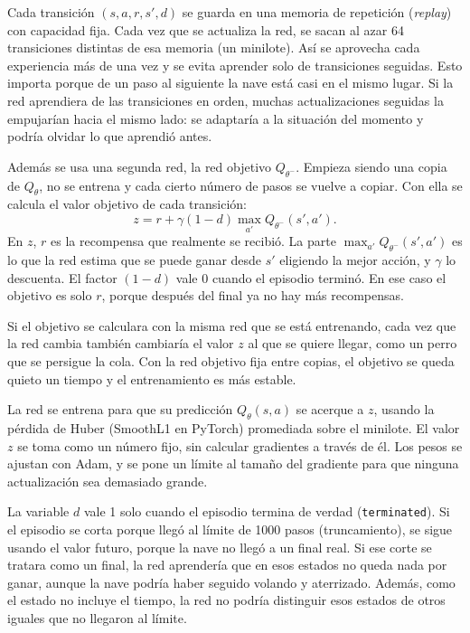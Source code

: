 \documentclass[conference]{IEEEtran}
\begin{document}
Cada transición $(s,a,r,s',d)$ se guarda en una memoria de repetición (\textit{replay}) con capacidad fija. Cada vez que se actualiza la red, se sacan al azar 64 transiciones distintas de esa memoria (un minilote). Así se aprovecha cada experiencia más de una vez y se evita aprender solo de transiciones seguidas. Esto importa porque de un paso al siguiente la nave está casi en el mismo lugar. Si la red aprendiera de las transiciones en orden, muchas actualizaciones seguidas la empujarían hacia el mismo lado: se adaptaría a la situación del momento y podría olvidar lo que aprendió antes.

Además se usa una segunda red, la red objetivo $Q_{\theta^-}$. Empieza siendo una copia de $Q_\theta$, no se entrena y cada cierto número de pasos se vuelve a copiar. Con ella se calcula el valor objetivo de cada transición:
\begin{equation}
 z=r+\gamma(1-d)\max_{a'}Q_{\theta^-}(s',a').
\end{equation}
En $z$, $r$ es la recompensa que realmente se recibió. La parte $\max_{a'}Q_{\theta^-}(s',a')$ es lo que la red estima que se puede ganar desde $s'$ eligiendo la mejor acción, y $\gamma$ lo descuenta. El factor $(1-d)$ vale 0 cuando el episodio terminó. En ese caso el objetivo es solo $r$, porque después del final ya no hay más recompensas.

Si el objetivo se calculara con la misma red que se está entrenando, cada vez que la red cambia también cambiaría el valor $z$ al que se quiere llegar, como un perro que se persigue la cola. Con la red objetivo fija entre copias, el objetivo se queda quieto un tiempo y el entrenamiento es más estable.

La red se entrena para que su predicción $Q_\theta(s,a)$ se acerque a $z$, usando la pérdida de Huber (SmoothL1 en PyTorch) promediada sobre el minilote. El valor $z$ se toma como un número fijo, sin calcular gradientes a través de él. Los pesos se ajustan con Adam, y se pone un límite al tamaño del gradiente para que ninguna actualización sea demasiado grande.

La variable $d$ vale 1 solo cuando el episodio termina de verdad (\texttt{terminated}). Si el episodio se corta porque llegó al límite de 1000 pasos (truncamiento), se sigue usando el valor futuro, porque la nave no llegó a un final real. Si ese corte se tratara como un final, la red aprendería que en esos estados no queda nada por ganar, aunque la nave podría haber seguido volando y aterrizado. Además, como el estado no incluye el tiempo, la red no podría distinguir esos estados de otros iguales que no llegaron al límite.
\end{document}
